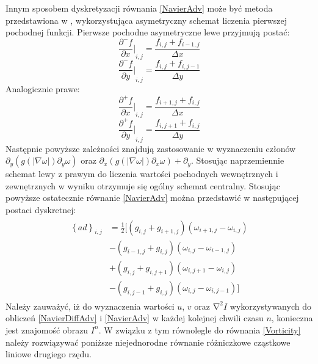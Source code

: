 \documentclass[12pt, twoside, openany]{report}
\theoremstyle{definition}
\begin{document}
\par
Innym sposobem dyskretyzacji równania \eqref{NavierAdv} może być metoda przedstawiona w \cite{van2005algorithms}, wykorzystująca asymetryczny schemat liczenia pierwszej pochodnej funkcji. Pierwsze pochodne asymetryczne lewe przyjmują postać:
\begin{equation}
{\frac{{\partial }^-f}{\partial x}|}_{i,j}=\frac{f_{i,j}+f_{i-1,j}}{\Delta x}
\label{leftdfdx}
\end{equation}
\begin{equation}
{\frac{{\partial }^-f}{\partial y}|}_{i,j}=\frac{f_{i,j}+f_{i,j-1}}{\Delta y}
\label{leftdfdy}
\end{equation}
Analogicznie prawe:
\begin{equation}
{\frac{{\partial }^+f}{\partial x}|}_{i,j}=\frac{f_{i+1,j}+f_{i,j}}{\Delta x} 
\label{rightdfdx}
\end{equation}
\begin{equation}
{\frac{{\partial }^+f}{\partial y}|}_{i,j}=\frac{f_{i,j+1}+f_{i,j}}{\Delta y}
\label{rightdfdy}
\end{equation}
Następnie powyższe zależności znajdują zastosowanie w wyznaczeniu członów\\ ${\partial }_y\left(g\left(\left|\nabla \omega \right|\right){\partial }_y\omega \right)$ oraz ${\partial }_x\left(g\left(\left|\nabla \omega \right|\right){\partial }_x\omega \right)+{\partial }_y$. Stosując naprzemiennie schemat lewy z prawym do liczenia wartości pochodnych wewnętrznych i zewnętrznych w wyniku otrzymuje się ogólny schemat centralny. Stosując powyższe ostatecznie równanie \eqref{NavierAdv} można przedstawić w następującej postaci dyskretnej:
\begin{align}
\begin{aligned}
{\left\{ad\right\}}_{i,j}
&= \frac{1}{2}\biggl[\left(g_{i,j}+g_{i+1,j}\right)\left({\omega }_{i+1,j}-{\omega }_{i,j}\right) \\[1ex]
&- \left(g_{i-1,j}+g_{i,j}\right)\left({\omega }_{i,j}-{\omega }_{i-1,j}\right)   \\[1ex]
&+ \left(g_{i,j}+g_{i,j+1}\right)\left({\omega }_{i,j+1}-{\omega }_{i,j}\right) \\[1ex]
&- \left(g_{i,j-1}+g_{i,j}\right)\left({\omega }_{i,j}-{\omega }_{i,j-1}\right)\biggl]
\end{aligned}
\label{discreteAnisotropic2}
\end{align}
Należy zauważyć, iż do wyznaczenia wartości $u$, $v$ oraz ${\mathrm{\nabla }}^2I$ wykorzystywanych do obliczeń \eqref{NavierDiffAdv} i \eqref{NavierAdv} w każdej kolejnej chwili czasu $n$, konieczna jest znajomość obrazu $I^n$. W związku z tym równolegle do równania \eqref{Vorticity} należy rozwiązywać poniższe niejednorodne równanie różniczkowe cząstkowe liniowe drugiego rzędu.
\end{document}
